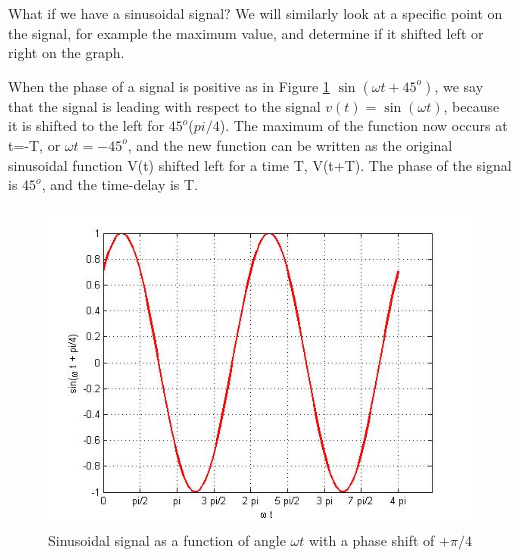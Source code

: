\documentclass{ximera}
\begin{document}
\begin{example}

What if we have a sinusoidal signal? We will similarly look at a specific point on the signal, for example the maximum value, and determine if it shifted left or right on the graph.

When the phase of a signal is positive as in Figure \ref{sinPlus45Ph} $ \sin (\omega t + 45^o)$, we say that the signal is leading with respect to the signal $v(t)= \sin (\omega t)$, because it is shifted to the left for $45^o$($pi/4$). The maximum of the function now occurs at t=-T, or $\omega t = -45^o$, and the new function can be written as the original sinusoidal function V(t) shifted left for a time T,  V(t+T). The phase of the signal is $45^o$, and the time-delay is T. 


\begin{figure}[htbp]
\includegraphics[scale=0.4]{jpg/cpef5.jpg}
\caption{Sinusoidal signal as a function of angle $\omega t$ with a phase shift of $+\pi/4$}
\label{sinPlus45Ph}
\end{figure}

\end{example}
\end{document}
